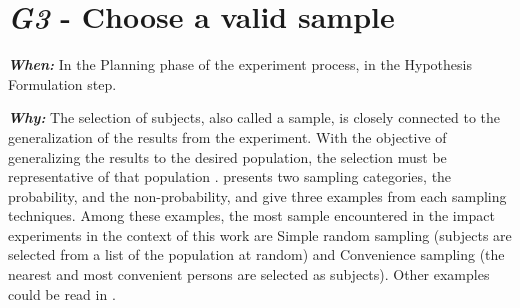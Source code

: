 \begin{table}[h]
	\captionsetup{width=16cm}%
    \end{table}

\vspace{5mm}

\section{\textit{G3} - Choose a valid sample}
\label{sec:guidelines-G3}

\noindent \textit{\textbf{When:}}  
In the Planning phase of the experiment process, in the Hypothesis Formulation step. 
\vspace{5mm}

\noindent \textit{\textbf{Why:}} The selection of subjects, also called a sample, is closely connected to the generalization of the results from the experiment. With the objective of generalizing the results to the desired population, the selection must be representative of that population \cite{Kitchenham2002PreliminaryEngineering}.  presents two sampling categories, the probability, and the non-probability, and give three examples from each sampling techniques. Among these examples, the most sample encountered in the impact experiments in the context of this work are Simple random sampling (subjects are selected from a list of the population at random) and Convenience sampling (the nearest and most convenient persons are selected as subjects). Other examples could be read in .

